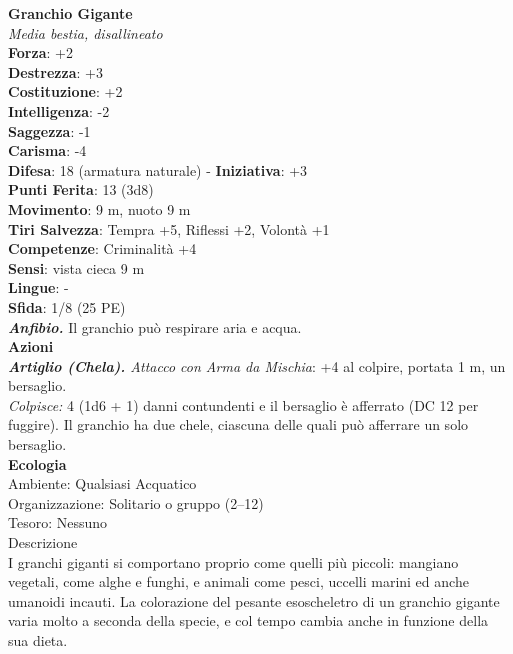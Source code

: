 \begin{multicols}{2}
\medskip\textbf{Granchio Gigante}\\
\emph{Media bestia, disallineato}\\
\textbf{Forza}: +2\\
\textbf{Destrezza}: +3\\
\textbf{Costituzione}: +2\\
\textbf{Intelligenza}: -2\\
\textbf{Saggezza}: -1\\
\textbf{Carisma}: -4\\
\textbf{Difesa}: 18 (armatura naturale) - \textbf{Iniziativa}: +3\\
\textbf{Punti Ferita}: 13 (3d8)\\
\textbf{Movimento}: 9 m, nuoto 9 m\\
\textbf{Tiri Salvezza}: Tempra +5, Riflessi +2, Volontà +1 \\
\textbf{Competenze}: Criminalità +4\\
\textbf{Sensi}: vista cieca 9 m\\
\textbf{Lingue}: -\\
\textbf{Sfida}: 1/8 (25 PE)\smallskip\\
\emph{\textbf{Anfibio.}} Il granchio può respirare aria e acqua.\\
\smallskip\textbf{Azioni}\\
\emph{\textbf{Artiglio (Chela).} Attacco con Arma da Mischia}: +4 al colpire, portata 1 m,  un bersaglio.\\
\emph{Colpisce:} 4 (1d6 + 1) danni contundenti e il bersaglio è afferrato (DC  12 per fuggire). Il granchio ha due chele, ciascuna delle quali può afferrare un solo bersaglio.\\
\textbf{Ecologia}\\
Ambiente: Qualsiasi Acquatico\\
Organizzazione: Solitario o gruppo (2–12)\\
Tesoro: Nessuno\\
Descrizione\\

I granchi giganti si comportano proprio come quelli più piccoli: mangiano vegetali, come alghe e funghi, e animali come pesci, uccelli marini ed anche umanoidi incauti. La colorazione del pesante esoscheletro di un granchio gigante varia molto a seconda della specie, e col tempo cambia anche in funzione della sua dieta. \\


\end{multicols}
